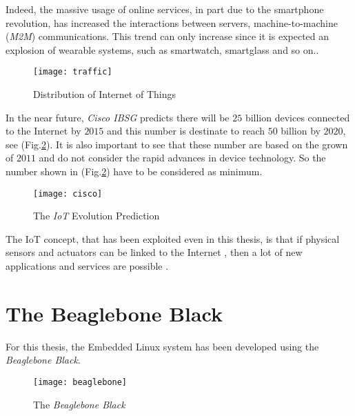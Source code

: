 Indeed, the massive usage of online services, in part due to the smartphone revolution, has increased the interactions between servers, machine-to-machine (\textit{M2M}) communications. This trend can only increase since it is expected an explosion of wearable systems, such as smartwatch, smartglass and so on..



\begin{figure}[h]
	\centering
	\texttt{[image: traffic]}
	\caption{Distribution of Internet of Things}
	\label{Fig:traffic}
	
\end{figure}

In the near future, \textit{Cisco IBSG} predicts there will be $25$ billion devices connected to the Internet by $2015$ and this number is destinate to reach $50$ billion by $2020$, see (Fig.\ref{Fig:cisco})\cite{CISCOIOT}. It is also important to see that these number are based on the grown of $2011$ and do  not consider the rapid advances in device technology. So the number shown in (Fig.\ref{Fig:cisco}) have to be considered as minimum.

\begin{figure}[h]
	\centering
	\texttt{[image: cisco]}
	\caption{The \textit{IoT} Evolution Prediction}
	\label{Fig:cisco}
	
\end{figure}


The IoT concept, that has been exploited even in this thesis, is that if physical sensors and actuators can be linked to the Internet , then a lot of new applications and services are possible \cite{EBB}.

\section{The Beaglebone Black}

For this thesis, the Embedded Linux system has been developed using the \textit{Beaglebone Black}.\\

\begin{figure}[h]
	\centering
	\texttt{[image: beaglebone]}
	\caption{The \textit{Beaglebone Black}}
	\label{Fig:beaglebone}
	
\end{figure}